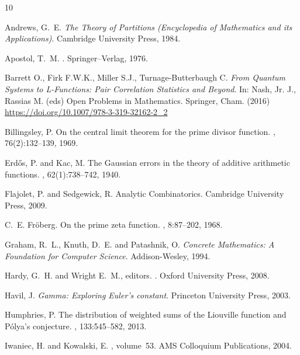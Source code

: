 \documentclass[10pt,reqno,letterpaper]{article}
\theoremstyle{plain}
\numberwithin{theorem}{section}
\theoremstyle{definition}
\newcounter{completeBibitemIncrementCtr}
\renewenvironment{thebibliography}[1]{
     \renewcommand{\refname}{} 
     
     \begin{oldthebibliography}{#1}
     \setlength{\itemsep}{0em}
     \setlength{\parskip}{0em}
     \setlength{\topsep}{0pt}
     \setlength{\partopsep}{0pt}
     \setcounter{enumiv}{\value{completeBibitemIncrementCtr}}
     \footnotesize 
}
{
     \setcounter{completeBibitemIncrementCtr}{\value{enumiv}}
     \end{oldthebibliography}
}
\begin{document}
\begin{thebibliography}{10}

Andrews, G.~E. \emph{The Theory of Partitions (Encyclopedia of Mathematics and its Applications)}. 
Cambridge University Press, 1984.

Apostol, T.~M.
.
\newblock Springer--Verlag, 1976.

Barrett O., Firk F.W.K., Miller S.J., Turnage-Butterbaugh C. 
\emph{From Quantum Systems to L-Functions: Pair Correlation Statistics and Beyond}. 
In: Nash, Jr. J., Rassias M. (eds) Open Problems in Mathematics. Springer, Cham. (2016) 
\url{https://doi.org/10.1007/978-3-319-32162-2_2}

Billingsley, P.
\newblock On the central limit theorem for the prime divisor function.
, 76(2):132--139, 1969.

Erd{\H{o}}s, P. and Kac, M.
\newblock The Gaussian errors in the theory of additive arithmetic functions.
, 62(1):738--742, 1940.

Flajolet, P. and Sedgewick, R. Analytic Combinatorics. Cambridge University Press, 2009.

C.~E. Fr{\"{o}}berg.
\newblock On the prime zeta function.
, 8:87--202, 1968.

Graham, R.~L., Knuth, D.~E. and Patashnik, O. 
\emph{Concrete Mathematics: A Foundation for Computer Science}. Addison-Wesley, 1994.

Hardy, G.~H. and Wright E.~M., editors.
.
\newblock Oxford University Press, 2008.

Havil, J.  \emph{Gamma: Exploring Euler's constant}. Princeton University Press, 2003. 

Humphries, P.
\newblock The distribution of weighted sums of the {L}iouville function and
  {P}\'{o}lya's conjecture.
, 133:545--582, 2013.

Iwaniec, H. and Kowalski, E.
, volume~53.
\newblock AMS Colloquium Publications, 2004.


\end{thebibliography}
\end{document}
